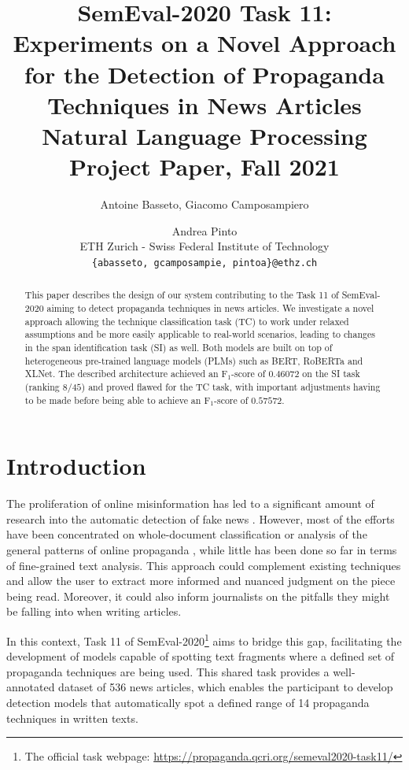 \documentclass[11pt]{article}
\title{SemEval-2020 Task 11: Experiments on a Novel Approach \\ for the Detection of Propaganda Techniques in News Articles\\
\vspace{0.2cm}
\small Natural Language Processing Project Paper, Fall 2021
}
\author{
Antoine Basseto,
Giacomo Camposampiero 
\and Andrea Pinto \\         
ETH Zurich - Swiss Federal Institute of Technology \\ 
\texttt{\{abasseto, gcamposampie, pintoa\}@ethz.ch}
}
\newcommand{\pol}[1]{{\fontfamily{pcr}\selectfont#1}}
\begin{document}
\maketitle

\begin{abstract}
This paper describes the design of our system contributing to the Task 11 of SemEval-2020 \cite{semeval} aiming to detect propaganda techniques in news articles.
We investigate a novel approach allowing the technique classification task (\pol{TC}) to work under relaxed assumptions and be more easily applicable to real-world scenarios, leading to changes in the span identification task (\pol{SI}) as well. Both models are built on top of heterogeneous pre-trained language models (\pol{PLMs}) such as \pol{BERT}, \pol{RoBERTa} and \pol{XLNet}.
The described architecture achieved an F$_1$-score of $0.46072$ on the \pol{SI} task (ranking $8/45$) and proved flawed for the \pol{TC} task, with important adjustments having to be made before being able to achieve an F$_1$-score of $0.57572$.
\end{abstract}

\section{Introduction}
The proliferation of online misinformation has led to a significant amount of research into the automatic detection of fake news \cite{fakenews}. However, most of the efforts have been concentrated on whole-document classification \cite{rashkin-etal-2017-truth} or analysis of the general patterns of online propaganda \cite{garimella2015, chatfield2015}, while little has been done so far in terms of fine-grained text analysis. This approach could complement existing techniques and allow the user to extract more informed and nuanced judgment on the piece being read. Moreover, it could also inform journalists on the pitfalls they might be falling into when writing articles.

In this context, Task 11 of SemEval-2020\footnote{The official task webpage: \url{https://propaganda.qcri.org/semeval2020-task11/}} \cite{semeval} aims to bridge this gap, facilitating the development of models capable of spotting text fragments where a defined set of propaganda techniques are being used. This shared task provides a well-annotated dataset of 536 news articles, which enables the participant to develop detection models that automatically spot a defined range of 14 propaganda techniques in written texts.
\end{document}
